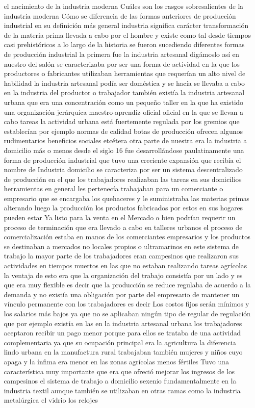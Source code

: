\documentclass[12pt]{book}
\begin{document}
el nacimiento de la industria moderna Cuáles son los rasgos sobresalientes de la industria moderna Cómo se diferencia de las formas anteriores de producción industrial en su definición más general industria significa carácter transformación de la materia prima llevada a cabo por el hombre y existe como tal desde tiempos casi prehistóricos a lo largo de la historia se fueron sucediendo diferentes formas de producción industrial la primera fue la industria artesanal digámoslo así en nuestro del salón se caracterizaba por ser una forma de actividad en la que los productores o fabricantes utilizaban herramientas que requerían un alto nivel de habilidad la industria artesanal podía ser doméstica y se hacía se llevaba a cabo en la industria del productor o trabajador también existía la industria artesanal urbana que era una concentración como un pequeño taller en la que ha existido una organización jerárquica maestro-aprendiz oficial oficial en la que se llevan a cabo tareas la actividad urbana está fuertemente regulada por los gremios que establecían por ejemplo normas de calidad botas de producción ofrecen algunos rudimentarios beneficios sociales etcétera otra parte de nuestra era la industria a domicilio más o menos desde el siglo 16 fue desarrollándose paulatinamente una forma de producción industrial que tuvo una creciente expansión que recibía el nombre de Industria domicilio se caracteriza por ser un sistema descentralizado de producción en el que los trabajadores realizaban las tareas en sus domicilios herramientas en general les pertenecía trabajaban para un comerciante o empresario que se encargaba los quehaceres y le suministraba las materias primas alterando luego la producción los productos fabricados por estos en sus hogares pueden estar Ya listo para la venta en el Mercado o bien podrían requerir un proceso de terminación que era llevado a cabo en talleres urbanos el proceso de comercialización estaba en manos de los comerciantes empresarios y los productos se destinaban a mercados no locales propios o ultramarinos en este sistema de trabajo la mayor parte de los trabajadores eran campesinos que realizaron sus actividades en tiempos muertos en las que no estaban realizando tareas agrícolas la ventaja de esto era que la organización del trabajo consistía por un lado y es que era muy flexible es decir que la producción se reduce regulaba de acuerdo a la demanda y no existía una obligación por parte del empresario de mantener un vínculo permanente con los trabajadores es decir Los costos fijos serán mínimos y los salarios más bajos ya que no se aplicaban ningún tipo de regular de regulación que por ejemplo existía en las en la industria artesanal urbana los trabajadores aceptaron recibir un pago menor porque para ellos se trataba de una actividad complementaria ya que su ocupación principal era la agricultura la diferencia lindo urbana en la manufactura rural trabajaban también mujeres y niños cuyo apaga y la ínfima era menor en las zonas agrícolas menos fértiles Tuvo una característica muy importante que era que ofreció mejorar los ingresos de los campesinos el sistema de trabajo a domicilio sexenio fundamentalmente en la industria textil aunque también se utilizaban en otras ramas como la industria metalúrgica el vidrio los relojes
\end{document}

